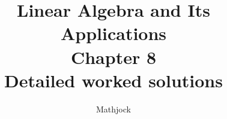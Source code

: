 
\title{\textbf{Linear Algebra and Its Applications}\\[0.3em]Chapter 8\\[0.3em]\large Detailed worked solutions}
\author{Mathjock}
\date{}

\maketitle
\bookinfo
\tableofcontents
\clearpage
\renewcommand{\thesection}{8.\arabic{section}}
\renewcommand{\theHsection}{8.\arabic{section}}
\setcounter{section}{0}

\clearpage
\renewcommand{\thesection}{8.\arabic{section}}
\renewcommand{\theHsection}{8.\arabic{section}}
\setcounter{section}{1}

\clearpage
\renewcommand{\thesection}{8.\arabic{section}}
\renewcommand{\theHsection}{8.\arabic{section}}
\setcounter{section}{2}

\clearpage
\renewcommand{\thesection}{8.\arabic{section}}
\renewcommand{\theHsection}{8.\arabic{section}}
\setcounter{section}{3}

\clearpage
\renewcommand{\thesection}{8.\arabic{section}}
\renewcommand{\theHsection}{8.\arabic{section}}
\setcounter{section}{4}

\clearpage
\renewcommand{\thesection}{8.\arabic{section}}
\renewcommand{\theHsection}{8.\arabic{section}}
\setcounter{section}{5}


